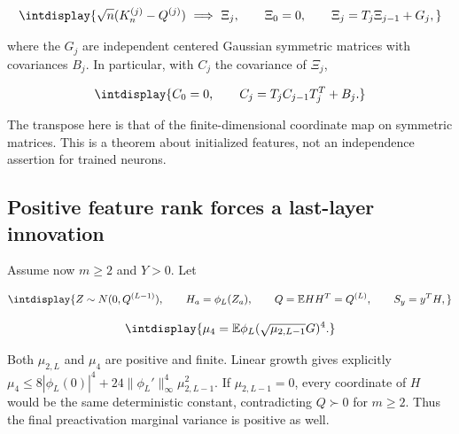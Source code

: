 \begingroup\renewcommand{\theHequation}{intdisplay.79}
\begin{equation*}
\intdisplay{
\sqrt n(K_n^{(j)}-Q^{(j)})\ \Longrightarrow\ \Xi_j,
\qquad \Xi_0=0,\qquad \Xi_j=T_j\Xi_{j-1}+G_j,
}
\end{equation*}
\endgroup


where the \(G_j\) are independent centered Gaussian symmetric matrices with covariances \(B_j\). In particular, with \(C_j\) the covariance of \(\Xi_j\),


\begingroup\renewcommand{\theHequation}{intdisplay.80}
\begin{equation*}
\intdisplay{
C_0=0,\qquad C_j=T_jC_{j-1}T_j^T+B_j.
}
\end{equation*}
\endgroup


The transpose here is that of the finite-dimensional coordinate map on symmetric matrices. This is a theorem about initialized features, not an independence assertion for trained neurons.


\subsection{Positive feature rank forces a last-layer innovation}
\label{int:dense-innovation-lower}


Assume now \(m\ge2\) and \(Y>0\). Let


\begingroup\renewcommand{\theHequation}{intdisplay.81}
\begin{equation*}
\intdisplay{
Z\sim N(0,Q^{(L-1)}),\qquad H_a=\phi_L(Z_a),\qquad
Q=\mathbb E HH^T=Q^{(L)},\qquad S_y=y^TH,
}
\end{equation*}
\endgroup

\begingroup\renewcommand{\theHequation}{intdisplay.82}
\begin{equation*}
\intdisplay{
\mu_4=\mathbb E\phi_L(\sqrt{\mu_{2,L-1}}G)^4.
}
\end{equation*}
\endgroup


Both \(\mu_{2,\allowbreak L}\) and \(\mu_4\) are positive and finite. Linear growth gives explicitly \(\mu_4\le8|\phi_L(0)|^4+ 24\|\phi_L'\|_\infty^4\mu_{2,\allowbreak L-1}^2\). If \(\mu_{2,\allowbreak L-1}=0\), every coordinate of \(H\) would be the same deterministic constant, contradicting \(Q\succ0\) for \(m\ge2\). Thus the final preactivation marginal variance is positive as well.


